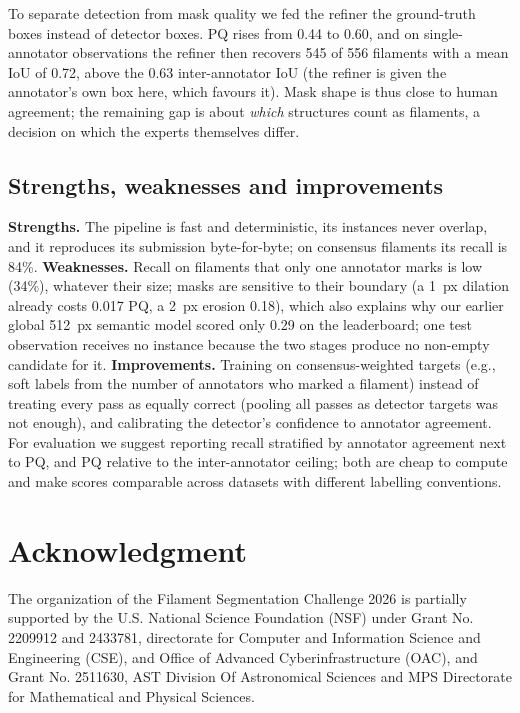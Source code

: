 \documentclass[sigconf]{acmart}
\begin{document}
To separate detection from mask quality we fed the refiner the ground-truth boxes instead of detector boxes. PQ rises from 0.44 to 0.60, and on single-annotator observations the refiner then recovers 545 of 556 filaments with a mean IoU of 0.72, above the 0.63 inter-annotator IoU (the refiner is given the annotator's own box here, which favours it). Mask shape is thus close to human agreement; the remaining gap is about \emph{which} structures count as filaments, a decision on which the experts themselves differ.

\subsection{Strengths, weaknesses and improvements}
\textbf{Strengths.} The pipeline is fast and deterministic, its instances never overlap, and it reproduces its submission byte-for-byte; on consensus filaments its recall is 84\%.
\textbf{Weaknesses.} Recall on filaments that only one annotator marks is low (34\%), whatever their size; masks are sensitive to their boundary (a 1~px dilation already costs 0.017 PQ, a 2~px erosion 0.18), which also explains why our earlier global 512~px semantic model scored only 0.29 on the leaderboard; one test observation receives no instance because the two stages produce no non-empty candidate for it.
\textbf{Improvements.} Training on consensus-weighted targets (e.g., soft labels from the number of annotators who marked a filament) instead of treating every pass as equally correct (pooling all passes as detector targets was not enough), and calibrating the detector's confidence to annotator agreement. For evaluation we suggest reporting recall stratified by annotator agreement next to PQ, and PQ relative to the inter-annotator ceiling; both are cheap to compute and make scores comparable across datasets with different labelling conventions.


\section{Acknowledgment}\label{sec:acknowledgment}
    The organization of the Filament Segmentation Challenge 2026 is partially supported by the U.S. National Science Foundation (NSF) under Grant No. 2209912 and 2433781, directorate for Computer and Information Science and Engineering (CSE), and Office of Advanced Cyberinfrastructure (OAC), and Grant No. 2511630, AST Division Of Astronomical Sciences and MPS Directorate for Mathematical and Physical Sciences.
\end{document}
